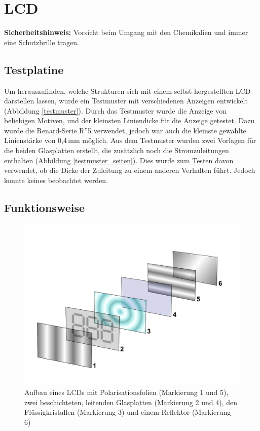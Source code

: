 \section{LCD}
\textbf{Sicherheitshinweis:} Vorsicht beim Umgang mit den Chemikalien und immer eine Schutzbrille tragen.

\subsection{Testplatine}
Um herauszufinden, welche Strukturen sich mit einem selbst-hergestellten LCD darstellen lassen, wurde ein Testmuster mit verschiedenen Anzeigen entwickelt (Abbildung \ref{testmuster}).
Durch das Testmuster wurde die Anzeige von beliebigen Motiven, und der kleinsten Liniendicke für die Anzeige getestet.
Dazu wurde die Renard-Serie R''5 verwendet, jedoch war auch die kleinste gewählte Linienstärke von 0,4\,mm möglich.
Aus dem Testmuster wurden zwei Vorlagen für die beiden Glasplatten erstellt, die zusätzlich noch die Stromzuleitungen enthalten
(Abbildung \ref{testmuster_seiten}).
Dies wurde zum Testen davon verwendet, ob die Dicke der Zuleitung zu einem anderen Verhalten führt.
Jedoch konnte keines beobachtet werden.


\label{testmuster-seite1}
\subsection{Funktionsweise}

\begin{figure}[t]
  \centering
  \includegraphics[height=0.3\textwidth, keepaspectratio]{Bilder/LCD_layers}
  \caption{Aufbau eines LCDs mit Polarisationsfolien (Markierung 1 und 5), zwei beschichteten, leitenden Glasplatten (Markierung 2 und 4), den Flüssigkristallen (Markierung 3) und einem Reflektor (Markierung 6)
  \cite{lcdlayers}}
  \label{lcdaufbau}
\end{figure}

